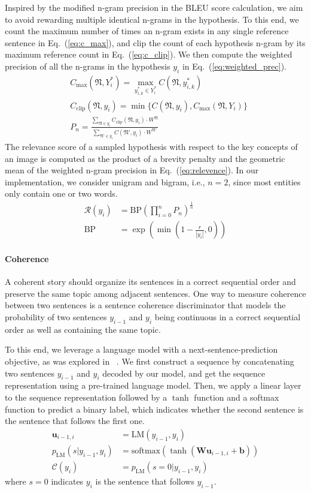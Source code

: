 \documentclass[letterpaper]{article} \usepackage{aaai20}  \usepackage{times}  \usepackage{helvet} \usepackage{courier}  \usepackage[hyphens]{url}  \usepackage{graphicx} \urlstyle{rm} \def\UrlFont{\rm}  \usepackage{graphicx}  \frenchspacing  \setlength{\pdfpagewidth}{8.5in}  \setlength{\pdfpageheight}{11in}  \usepackage{times}
\newcommand{\rbr}[1]{\left(#1\right)}
\newcommand{\bb}{\mathbf{b}}
\newcommand{\Wb}{\mathbf{W}}
\newcommand{\ub}{\mathbf{u}}
\newcommand{\ngram}{\mathfrak{N}} \newcommand{\relevence}{\mathcal{R}} \newcommand{\coherence}{\mathcal{C}} \newcommand{\expressive}{\mathcal{E}} \newcommand{\model}{ReCo-RL } \newcommand{\mle}{MLE }
\newcommand{\citet}[1]{\citeauthor{#1} \shortcite{#1}}
\begin{document}
Inspired by the modified n-gram precision in the BLEU score calculation, we aim to avoid rewarding multiple identical n-grams in the hypothesis. To this end, we count the maximum number of times an n-gram exists in any single reference sentence in Eq.~(\ref{eq:c_max}), and clip the count of each hypothesis n-gram by its maximum reference count in Eq.~(\ref{eq:c_clip}). We then compute the weighted precision of all the n-grams in the hypothesis $y_i$ in Eq.~(\ref{eq:weighted_prec}).
\begin{align} \label{eq:c_max}
    & C_\text{max}(\ngram, Y^*_i) = \max_{y^*_{i,k}\in Y^*_i} C(\ngram, y^*_{i,k}) \\ \label{eq:c_clip}
    & C_\text{clip}(\ngram, y_i)  = \min\{C(\ngram, y_i), C_\text{max}(\ngram, Y_i)\} \\ \label{eq:weighted_prec}
    &P_n = \frac{\sum_{\ngram \in y_i} C_\text{clip}(\ngram, y_i) \cdot W^\ngram }{ \sum_{\ngram' \in y_i} C(\ngram', y_i) \cdot W^{\ngram'} }
\end{align}
 The relevance score of a sampled hypothesis with respect to the key concepts of an image is computed as the product of a brevity penalty and the geometric mean of the weighted n-gram precision in Eq.~(\ref{eq:relevence}). In our implementation, we consider unigram and bigram, i.e., $n=2$, since most entities only contain one or two words.
\begin{align} \label{eq:relevence} 
    \relevence(y_i) &= \text{BP} \rbr{\prod_{i=0}^n P_n}^{\frac{1}{n}} \\
    \text{BP}& =\exp \rbr{\min\rbr{1- \frac{r}{|y_i|}, 0}} 
\end{align}


\paragraph{Coherence}
A coherent story should organize its sentences in a correct sequential order and preserve the same topic among adjacent sentences. One way to measure coherence between two sentences is a sentence coherence discriminator that models the probability of two sentences $y_{i-1}$ and $y_i$ being continuous in a correct sequential order as well as containing the same topic. 

To this end, we leverage a language model with a next-sentence-prediction objective, as was explored in~\citet{devlin2018bert}. We first construct a sequence by concatenating two sentences $y_{i-1}$ and $y_i$ decoded by our model, and get the sequence representation using a pre-trained language model. Then, we apply a linear layer to the sequence representation followed by a $\tanh$ function and a softmax function to predict a binary label, which indicates whether the second sentence is the sentence that follows the first one.
\begin{align}
    \ub_{i-1,i} & = \text{LM}(y_{i-1}, y_{i}) \\
    p_\text{LM}(s|y_{i-1}, y_{i}) & = \text{softmax} \rbr{\tanh \rbr{\Wb \ub_{i-1,i} + \bb}} \\
    \coherence(y_i) & = p_\text{LM}(s=0|y_{i-1}, y_{i})
\end{align}
where $s=0$ indicates $y_{i}$ is the sentence that follows $y_{i-1}$. 
\end{document}
